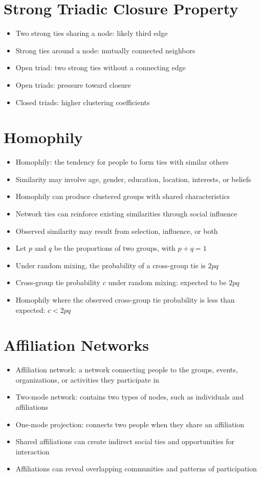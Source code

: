 \section{Strong Triadic Closure Property}
\begin{itemize}
  \item Two strong ties sharing a node: likely third edge
  \item Strong ties around a node: mutually connected neighbors
  \item Open triad: two strong ties without a connecting edge
  \item Open triads: pressure toward closure
  \item Closed triads: higher clustering coefficients
\end{itemize}

\section{Homophily}
\begin{itemize}
  \item Homophily: the tendency for people to form ties with similar others
  \item Similarity may involve age, gender, education, location, interests, or beliefs
  \item Homophily can produce clustered groups with shared characteristics
  \item Network ties can reinforce existing similarities through social influence
  \item Observed similarity may result from selection, influence, or both
  \item Let $p$ and $q$ be the proportions of two groups, with $p+q=1$
  \item Under random mixing, the probability of a cross-group tie is $2pq$
  \item Cross-group tie probability $c$ under random mixing: expected to be $2pq$
  \item Homophily where the observed cross-group tie probability is less than expected: $c < 2pq$
\end{itemize}

\section{Affiliation Networks}
\begin{itemize}
  \item Affiliation network: a network connecting people to the groups, events, organizations, or activities they participate in
  \item Two-mode network: contains two types of nodes, such as individuals and affiliations
  \item One-mode projection: connects two people when they share an affiliation
  \item Shared affiliations can create indirect social ties and opportunities for interaction
  \item Affiliations can reveal overlapping communities and patterns of participation
\end{itemize}

